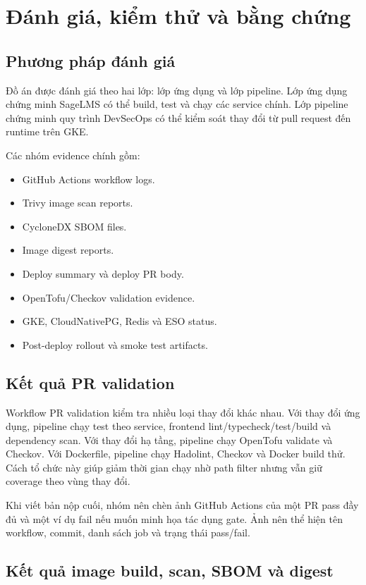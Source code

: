 \chapter{Đánh giá, kiểm thử và bằng chứng}
\label{chap:evaluation}

\section{Phương pháp đánh giá}

Đồ án được đánh giá theo hai lớp: lớp ứng dụng và lớp pipeline. Lớp ứng dụng chứng minh SageLMS có thể build, test và chạy các service chính. Lớp pipeline chứng minh quy trình DevSecOps có thể kiểm soát thay đổi từ pull request đến runtime trên GKE.

Các nhóm evidence chính gồm:

\begin{itemize}
  \item GitHub Actions workflow logs.
  \item Trivy image scan reports.
  \item CycloneDX SBOM files.
  \item Image digest reports.
  \item Deploy summary và deploy PR body.
  \item OpenTofu/Checkov validation evidence.
  \item GKE, CloudNativePG, Redis và ESO status.
  \item Post-deploy rollout và smoke test artifacts.
\end{itemize}

\section{Kết quả PR validation}

Workflow PR validation kiểm tra nhiều loại thay đổi khác nhau. Với thay đổi ứng dụng, pipeline chạy test theo service, frontend lint/typecheck/test/build và dependency scan. Với thay đổi hạ tầng, pipeline chạy OpenTofu validate và Checkov. Với Dockerfile, pipeline chạy Hadolint, Checkov và Docker build thử. Cách tổ chức này giúp giảm thời gian chạy nhờ path filter nhưng vẫn giữ coverage theo vùng thay đổi.

Khi viết bản nộp cuối, nhóm nên chèn ảnh GitHub Actions của một PR pass đầy đủ và một ví dụ fail nếu muốn minh họa tác dụng gate. Ảnh nên thể hiện tên workflow, commit, danh sách job và trạng thái pass/fail.

\section{Kết quả image build, scan, SBOM và digest}

